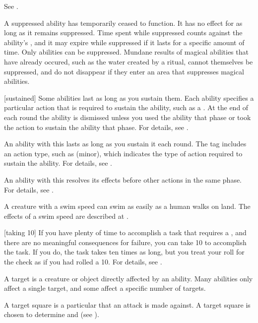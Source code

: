  See .

 A suppressed ability has temporarily ceased to function.
It has no effect for as long as it remains suppressed.
Time spent while suppressed counts against the ability's , and it may expire while suppressed if it lasts for a specific amount of time.
Only  abilities can be suppressed.
Mundane results of magical abilities that have already occured, such as the water created by a  ritual, cannot themselves be suppressed, and do not disappear if they enter an area that suppresses magical abilities.

[sustained] Some abilities last as long as you sustain them.
Each ability specifies a particular action that is required to sustain the ability, such as a .
At the end of each round the ability is dismissed unless you used the ability that phase or took the action to sustain the ability that phase.
For details, see .

 An ability with this  lasts as long as you sustain it each round.
The tag includes an action type, such as (minor), which indicates the type of action required to sustain the ability.
For details, see .

 An ability with this  resolves its effects before other actions in the same phase.
For details, see .

 A creature with a swim speed can swim as easily as a human walks on land.
The effects of a swim speed are described at .

[taking 10] If you have plenty of time to accomplish a task that requires a , and there are no meaningful consequences for failure, you can take 10 to accomplish the task.
If you do, the task takes ten times as long, but you treat your roll for the check as if you had rolled a 10.
For details, see .

 A target is a creature or object directly affected by an ability.
Many abilities only affect a single target, and some affect a specific number of targets.

 A target square is a particular  that an attack is made against.
A target square is chosen to determine  and  (see ).


